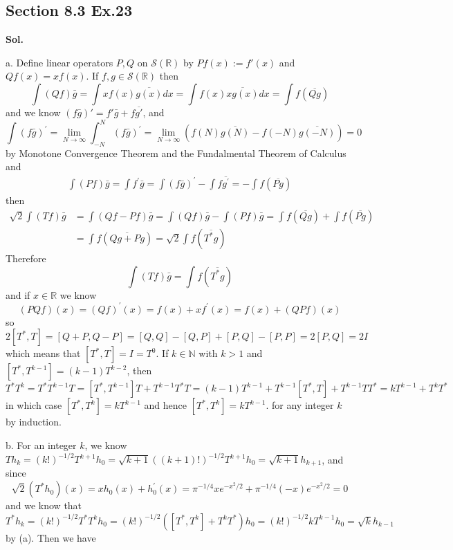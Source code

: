\documentclass[lang=en,11pt,a4paper,citestyle =authoryear]{elegantpaper}
\newcommand{\Sch}{\mathcal{S}}
\begin{document}
\subsection*{Section 8.3 Ex.23} 
\textbf{Sol.} \par
a. Define linear operators $P, Q$ on $\mathcal{\Sch}(\mathbb{R})$ by $Pf(x):=f'(x)$ and $Q f(x)=x f(x)$. If $f, g \in \Sch(\mathbb{R})$ then
\[
\int(Q f) \bar{g}=\int x f(x) \overline{g(x)} d x=\int f(x) \overline{x g(x)} d x=\int f(\overline{Q g})
\]
and we know $(f \bar{g})'=f' \bar{g}+f \overline{g'}$, and 
\[
\int(f \bar{g})^{\prime}=\lim _{N \rightarrow \infty} \int_{-N}^{N}(f \bar{g})^{\prime}=\lim _{N \rightarrow \infty}(f(N) \overline{g(N)}-f(-N) \overline{g(-N)})=0
\]
by Monotone Convergence Theorem and the Fundalmental Theorem of Calculus and
\[
\begin{aligned}
\int(P f) \bar{g}=\int f^{\prime} \bar{g}=\int(f \bar{g})^{\prime}-\int f \overline{g^{\prime}}=-\int f(\overline{P g})
\end{aligned}
\]
then
\[
\begin{aligned}
\sqrt{2} \int(T f) \bar{g}&=\int(Q f-P f) \bar{g}=\int(Q f) \bar{g}-\int(P f) \bar{g}=\int f(\overline{Q g})+\int f(\overline{P g})\\ &=\int f(\overline{Q g+P g})=\sqrt{2} \int f\left(\overline{T^{*} g}\right)
\end{aligned}
\]
Therefore \[\int(T f) \bar{g}=\int f\left(\overline{T^{*} g}\right)\] and if $x \in \mathbb{R}$ we know 
\[(P Q f)(x)=(Q f)^{\prime}(x)=f(x)+x f^{\prime}(x)=f(x)+(Q P f)(x)\] 
so
\[
2\left[T^{*}, T\right]=[Q+P, Q-P]=[Q, Q]-[Q, P]+[P, Q]-[P, P]=2[P, Q]=2 I
\]
which means that $\left[T^{*}, T\right]=I=T^{0}$. If $k \in \mathbb{N}$ with $k>1$ and $\left[T^{*}, T^{k-1}\right]=(k-1) T^{k-2}$, then
\[
T^{*} T^{k}=T^{*} T^{k-1} T=\left[T^{*}, T^{k-1}\right] T+T^{k-1} T^{*} T=(k-1) T^{k-1}+T^{k-1}\left[T^{*}, T\right]+T^{k-1} T T^{*}=k T^{k-1}+T^{k} T^{*}
\]
in which case $\left[T^{*}, T^{k}\right]=k T^{k-1}$ and hence $\left[T^{*}, T^{k}\right]=k T^{k-1}$. for any integer $k$ by induction.\par
b. For an integer $k$, we know $T h_{k}=(k !)^{-1 / 2} T^{k+1} h_{0}=\sqrt{k+1}((k+1) !)^{-1 / 2} T^{k+1} h_{0}=\sqrt{k+1} h_{k+1}$, and since
\[
\sqrt{2}\left(T^{*} h_{0}\right)(x)=x h_{0}(x)+h_{0}^{\prime}(x)=\pi^{-1 / 4} x e^{-x^{2} / 2}+\pi^{-1 / 4}(-x) e^{-x^{2} / 2}=0\]
and we know that $T^{*} h_{k}=(k !)^{-1 / 2} T^{*} T^{k} h_{0}=(k !)^{-1 / 2}\left(\left[T^{*}, T^{k}\right]+T^{k} T^{*}\right) h_{0}=(k !)^{-1 / 2} k T^{k-1} h_{0}=\sqrt{k} h_{k-1}$ by (a). Then we have 
\end{document}

